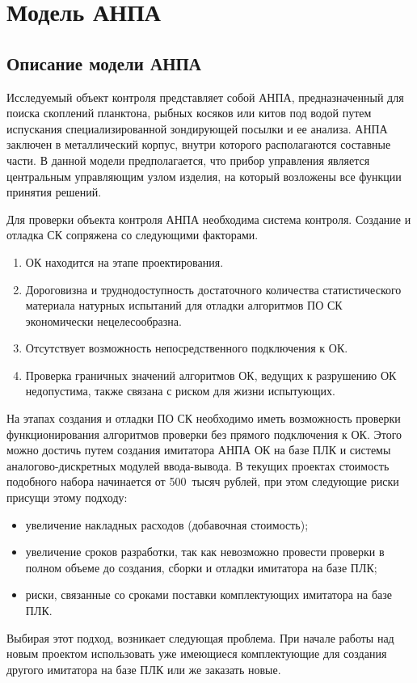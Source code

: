 \chapter{Модель АНПА}
\section{Описание модели АНПА} \label{sec:model_anpa}

Исследуемый объект контроля представляет собой АНПА, предназначенный для поиска скоплений планктона,
рыбных косяков или китов под водой путем испускания специализированной зондирующей посылки и ее анализа.
АНПА заключен в металлический корпус, внутри которого располагаются составные части.
В данной модели предполагается, что прибор управления является центральным управляющим узлом изделия,
на который возложены все функции принятия решений.

Для проверки объекта контроля АНПА необходима система контроля.
Создание и отладка СК сопряжена со следующими факторами.
\begin{enumerate}
    \item ОК находится на этапе проектирования.
    \item Дороговизна и труднодоступность достаточного количества статистического материала
    натурных испытаний для отладки алгоритмов ПО СК экономически нецелесообразна.
    \item Отсутствует возможность непосредственного подключения к ОК.
    \item Проверка граничных значений алгоритмов ОК, ведущих к разрушению ОК недопустима, также связана с риском для жизни испытующих.
\end{enumerate}
На этапах создания и отладки ПО СК необходимо иметь возможность проверки
функционирования алгоритмов проверки без прямого подключения к ОК.
Этого можно достичь путем создания имитатора АНПА ОК на базе ПЛК и системы аналогово-дискретных
модулей ввода-вывода.
В текущих проектах стоимость подобного набора начинается от 500~тысяч рублей,
при этом следующие риски присущи этому подходу:
\begin{itemize}
    \item увеличение накладных расходов (добавочная стоимость);
    \item увеличение сроков разработки, так как невозможно провести проверки в полном объеме до 
        создания, сборки и отладки имитатора на базе ПЛК;
    \item риски, связанные со сроками поставки комплектующих имитатора на базе ПЛК.
\end{itemize}
Выбирая этот подход, возникает следующая проблема.
При начале работы над новым проектом использовать уже имеющиеся комплектующие для создания другого имитатора на базе ПЛК или же заказать новые.

